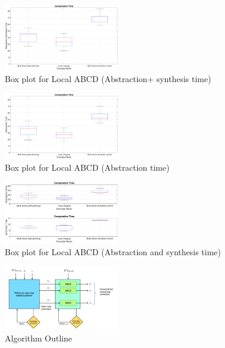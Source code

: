  \begin{figure}[h]
	\centering
	\includegraphics[width=0.45\textwidth]{figures/box1.eps}
	\caption{Box plot for Local ABCD (Abstraction+ synthesis time)}
	\label{fig:Temp1}
\end{figure}
 \begin{figure}[h]
	\centering
	\includegraphics[width=0.45\textwidth]{figures/box2.eps}
	\caption{Box plot for Local ABCD (Abstraction time)}
	\label{fig:Temp2}
\end{figure}
 \begin{figure}[h]
	\centering
	\includegraphics[width=0.45\textwidth]{figures/box3.eps}
	\caption{Box plot for Local ABCD (Abstraction and synthesis time)}
	\label{fig:Temp3}
\end{figure}
 \begin{figure}[h]
	\centering
	\includegraphics[width=0.45\textwidth]{figures/Algorithm_outline.pdf}
	\caption{Algorithm Outline}
	\label{fig:Temp4}
\end{figure}


